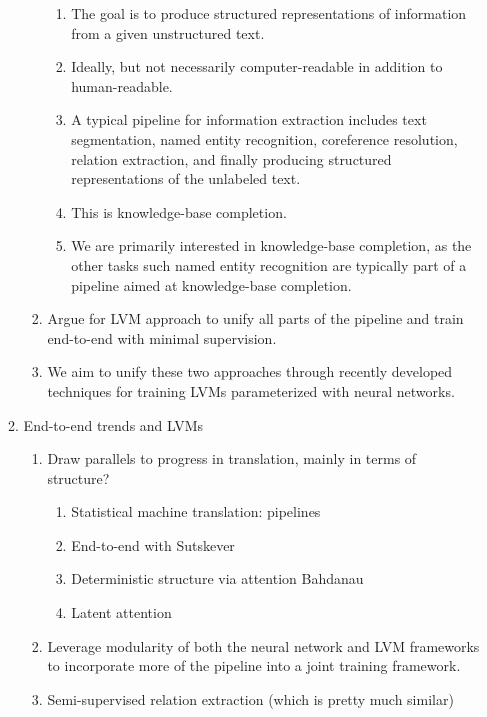 \documentclass[11pt]{article}
\begin{document}
\begin{enumerate}
\begin{enumerate}
\begin{enumerate}
\begin{enumerate}
            \item The goal is to produce structured representations of information from
                a given unstructured text.
            \item Ideally, but not necessarily computer-readable in addition to human-readable.
            \item A typical pipeline for information extraction includes
                text segmentation, named entity recognition, coreference resolution,
                relation extraction, and finally producing structured representations of the unlabeled text.
            \item This is knowledge-base completion.
            \item We are primarily interested in knowledge-base completion,
                as the other tasks such named entity recognition are typically
                part of a pipeline aimed at knowledge-base completion.
            \end{enumerate}
        \item Argue for LVM approach to unify all parts of the pipeline and train
            end-to-end with minimal supervision.
        \item We aim to unify these two approaches through recently developed techniques for training LVMs
            parameterized with neural networks.
        \end{enumerate}
    \item End-to-end trends and LVMs
        \begin{enumerate}
        \item Draw parallels to progress in translation, mainly in terms of structure?
            \begin{enumerate}
            \item Statistical machine translation: pipelines
            \item End-to-end with Sutskever
            \item Deterministic structure via attention Bahdanau
            \item Latent attention \citet{deng2018attn}
            \end{enumerate}
        \item Leverage modularity of both the neural network and LVM frameworks
            to incorporate more of the pipeline into a joint training framework.
        \item \citet{qu2017ssre} Semi-supervised relation extraction (which is pretty much similar)

\end{enumerate}
\end{enumerate}
\end{enumerate}
\end{document}
